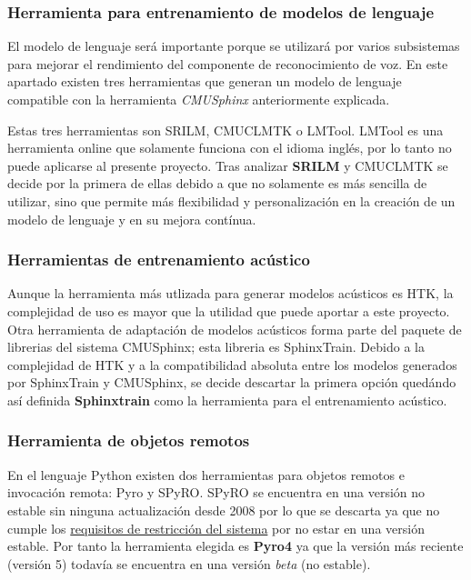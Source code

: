 \documentclass[../main.tex]{subfiles}
\begin{document}
\subsubsection{Herramienta para entrenamiento de modelos de lenguaje}\label{subsub:at-srilm}
El modelo de lenguaje será importante porque se utilizará por varios subsistemas para mejorar el rendimiento del componente de reconocimiento de voz. En este apartado existen tres herramientas que generan un modelo de lenguaje compatible con la herramienta \textit{CMUSphinx} anteriormente explicada.

Estas tres herramientas son SRILM\cite{}, CMUCLMTK\cite{} o LMTool\cite{}. LMTool es una herramienta online que solamente funciona con el idioma inglés, por lo tanto no puede aplicarse al presente proyecto. Tras analizar \textbf{SRILM} y CMUCLMTK se decide por la primera de ellas debido a que no solamente es más sencilla de utilizar, sino que permite más flexibilidad y personalización en la creación de un modelo de lenguaje y en su mejora contínua.

\subsubsection{Herramientas de entrenamiento acústico}\label{subsub:at-sphinxbase}
Aunque la herramienta más utlizada para generar modelos acústicos es HTK\cite{}, la complejidad de uso es mayor que la utilidad que puede aportar a este proyecto. Otra herramienta de adaptación de modelos acústicos forma parte del paquete de librerias del sistema CMUSphinx; esta libreria es SphinxTrain. Debido a la complejidad de HTK y a la compatibilidad absoluta entre los modelos generados por SphinxTrain y CMUSphinx, se decide descartar la primera opción quedándo así definida \textbf{Sphinxtrain} como la herramienta para el entrenamiento acústico.

\subsubsection{Herramienta de objetos remotos}\label{subsub:at-pyro}
En el lenguaje Python existen dos herramientas para objetos remotos e invocación remota: Pyro\cite{} y SPyRO\cite{}. SPyRO se encuentra en una versión no estable sin ninguna actualización desde 2008 por lo que se descarta ya que no cumple los \hyperref[subsubsec:restricciones]{requisitos de restricción del sistema} por no estar en una versión estable. Por tanto la herramienta elegida es \textbf{Pyro4} ya que la versión más reciente (versión 5) todavía se encuentra en una versión \textit{beta} (no estable).
\end{document}
